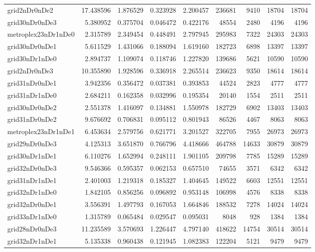 \begin{longtable}{|l|r|r|r|r|r|r|r|r|}
grid2nDr0nDe2 & 17.438596 & 1.876529 & 0.323928 & 2.200457 & 236681 & 9410 & 18704 & 18704 \\
grid30nDr0nDe3 & 5.380952 & 0.375704 & 0.046472 & 0.422176 & 48554 & 2480 & 4196 & 4196 \\
metroplex23nDr1nDe0 & 2.315789 & 2.349454 & 0.448491 & 2.797945 & 295983 & 7322 & 24303 & 24303 \\
grid30nDr0nDe1 & 5.611529 & 1.431066 & 0.188094 & 1.619160 & 182723 & 6898 & 13397 & 13397 \\
grid30nDr1nDe0 & 2.894737 & 1.109074 & 0.118746 & 1.227820 & 139686 & 5621 & 10590 & 10590 \\
grid2nDr0nDe3 & 10.355890 & 1.928596 & 0.336918 & 2.265514 & 236623 & 9350 & 18614 & 18614 \\
grid31nDr0nDe1 & 3.942356 & 0.356472 & 0.037381 & 0.393853 & 44524 & 2823 & 4777 & 4777 \\
grid31nDr1nDe0 & 2.684211 & 0.162358 & 0.032996 & 0.195354 & 20140 & 1554 & 2511 & 2511 \\
grid30nDr0nDe2 & 2.551378 & 1.416097 & 0.134881 & 1.550978 & 182729 & 6902 & 13403 & 13403 \\
grid31nDr0nDe2 & 9.676692 & 0.706831 & 0.095112 & 0.801943 & 86526 & 4467 & 8063 & 8063 \\
metroplex23nDr1nDe1 & 6.453634 & 2.579756 & 0.621771 & 3.201527 & 322705 & 7955 & 26973 & 26973 \\
grid29nDr0nDe3 & 4.125313 & 3.651870 & 0.766796 & 4.418666 & 464788 & 14633 & 30879 & 30879 \\
grid30nDr1nDe1 & 6.110276 & 1.652994 & 0.248111 & 1.901105 & 209798 & 7785 & 15289 & 15289 \\
grid32nDr0nDe3 & 9.546366 & 0.595357 & 0.062153 & 0.657510 & 74655 & 3571 & 6342 & 6342 \\
grid31nDr1nDe1 & 2.401003 & 1.219318 & 0.185327 & 1.404645 & 149522 & 6603 & 12551 & 12551 \\
grid32nDr1nDe0 & 1.842105 & 0.856256 & 0.096892 & 0.953148 & 106998 & 4576 & 8338 & 8338 \\
grid32nDr0nDe1 & 3.556391 & 1.497793 & 0.167053 & 1.664846 & 188532 & 7278 & 14024 & 14024 \\
grid33nDr1nDe0 & 1.315789 & 0.065484 & 0.029547 & 0.095031 & 8048 & 928 & 1384 & 1384 \\
grid28nDr0nDe3 & 11.235589 & 3.570693 & 1.226447 & 4.797140 & 418622 & 14754 & 30514 & 30514 \\
grid32nDr1nDe1 & 5.135338 & 0.960438 & 0.121945 & 1.082383 & 122204 & 5121 & 9479 & 9479 \\

\end{longtable}
